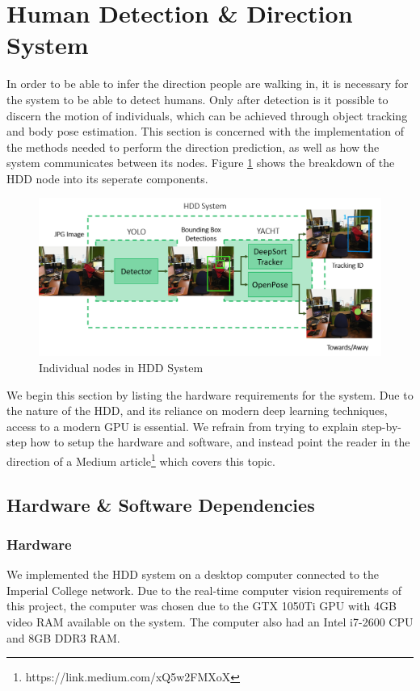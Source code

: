 \section{Human Detection \& Direction System}
In order to be able to infer the direction people are walking in, it is necessary for the system to be able to detect humans. Only after detection is it possible to discern the motion of individuals, which can be achieved through object tracking and body pose estimation. This section is concerned with the implementation of the methods needed to perform the direction prediction, as well as how the system communicates between its nodes. Figure \ref{fig:detailedHDD} shows the breakdown of the HDD node into its seperate components. 

\begin{figure}[ht]
	\centering
	\includegraphics[width=1.0\linewidth]{img/chapter5_implementation/hddSystemDiagram.png}
	\caption{Individual nodes in HDD System}
	\label{fig:detailedHDD}
\end{figure}

We begin this section by listing the hardware requirements for the system. Due to the nature of the HDD, and its reliance on modern deep learning techniques, access to a modern GPU is essential. We refrain from trying to explain step-by-step how to setup the hardware and software, and instead point the reader in the direction of a Medium article\footnote{https://link.medium.com/xQ5w2FMXoX} which covers this topic.

\subsection{Hardware \& Software Dependencies}

\subsubsection{Hardware}
We implemented the HDD system on a desktop computer connected to the Imperial College network. Due to the real-time computer vision requirements of this project, the computer was chosen due to the GTX 1050Ti GPU with 4GB video RAM available on the system. The computer also had an Intel i7-2600 CPU and 8GB DDR3 RAM.

